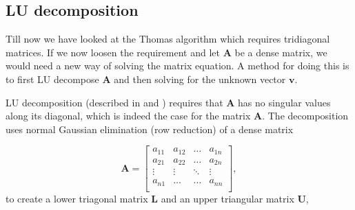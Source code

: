 \documentclass{emulateapj}
\begin{document}
    \subsection{LU decomposition}
        
        Till now we have looked at the Thomas algorithm which requires tridiagonal matrices. If we now loosen the requirement and let \(\textbf{A}\) be a dense matrix, we would need a new way of solving the matrix equation. A method for doing this is to first LU decompose \(\textbf{A}\) and then solving for the unknown vector \(\textbf{v}\).
        
        LU decomposition (described in \cite[Chapter 2]{linalg} and \cite[Chapter 6]{compfys}) requires that \(\textbf{A}\) has no singular values along its diagonal, which is indeed the case for the matrix $\textbf{A}$. The decomposition uses normal Gaussian elimination (row reduction) of a dense matrix 
        
        \begin{equation*}
            \mathbf{A} = \begin{bmatrix}
               a_{11} & a_{12} & \ldots & a_{1n} \\
               a_{21} & a_{22} & \ldots & a_{2n} \\
               \vdots & \vdots & \ddots & \vdots \\
               a_{n1} & \ldots & \ldots & a_{nn} \\
            \end{bmatrix},
        \end{equation*}
        to create a lower triagonal matrix \(\textbf{L}\) and an upper triangular matrix \(\textbf{U}\),
        
\end{document}
